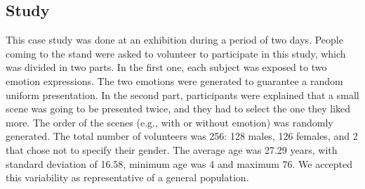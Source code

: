 \subsection{Study}

This case study was done at an exhibition during a period of two days. People coming to the stand were asked to volunteer to participate in this study, which was divided in two parts. In the first one, each subject was exposed to two emotion expressions. %
The two emotions were generated to guarantee a random uniform presentation. In the second part, participants were explained that a small scene was going to be presented twice, and they had to select the one they liked more. The order of the scenes (e.g., with or without emotion) was randomly generated. The total number of volunteers was 256: 128 males, 126 females, and 2 that chose not to specify their gender. The average age was 27.29 years, with standard deviation of 16.58, minimum age was 4 and maximum 76. We accepted this variability as representative of a general population.
